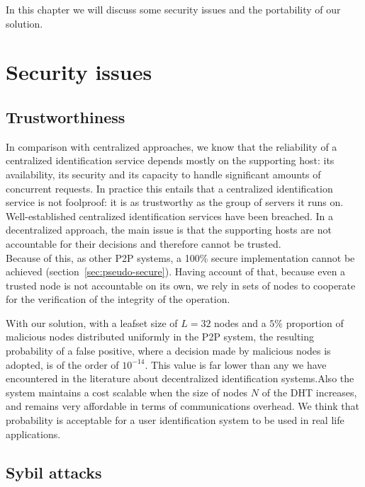 In this chapter we will discuss some security issues and the portability of our
solution.%

\section{Security issues}
\subsection{Trustworthiness}
In comparison with centralized approaches, we know that the reliability of a
centralized identification service depends mostly on the
supporting host: its availability, its security and its capacity  to handle
significant amounts of concurrent requests. 
In practice this entails that a centralized identification service is not
foolproof: it is as trustworthy as the group of servers it runs on.
Well-established centralized identification services have been breached. %
In a decentralized approach, the main issue is that the supporting hosts are
not accountable for their decisions and therefore cannot be trusted.\\

Because of this, as other P2P systems, a 100\% secure implementation cannot be achieved
(section~\ref{sec:pseudo-secure}).
Having account of that, because even a trusted node is not accountable on its
own, we rely in sets of nodes to cooperate for the verification of the
integrity of the operation.

With our solution, with a leafset size of $L = 32$ nodes and a
$5\%$ proportion of malicious nodes distributed uniformly in the P2P system, the resulting probability of a false
positive, where a decision made by malicious nodes is adopted, is of the order
of $10^{-14}$. 
This value is far lower than any we have encountered in the
literature about decentralized identification systems.Also the system maintains a cost scalable when the size of nodes $N$ of the DHT
increases, and remains very affordable in terms of communications overhead. 
We think that probability is acceptable for a user identification system to be
used in real life applications.


\subsection{Sybil attacks}
\label{sec:sybil_attacks}


